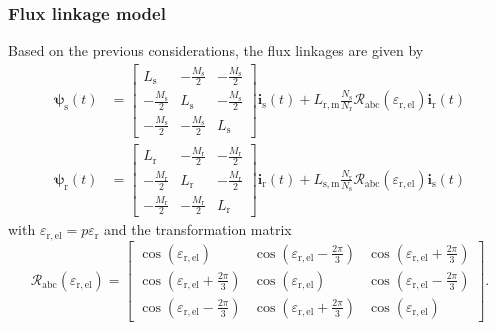 \begin{frame}
	\frametitle{Flux linkage model}
    Based on the previous considerations, the flux linkages are given by
    \begin{equation}
        \renewcommand*{\arraystretch}{1.15}
        \begin{split}
            \bm{\psi}_\mathrm{s}(t) &=\begin{bmatrix}
                L_\mathrm{s} & -\frac{M_\mathrm{s}}{2} & -\frac{M_\mathrm{s}}{2}\\
                -\frac{M_\mathrm{s}}{2} & L_\mathrm{s} & -\frac{M_\mathrm{s}}{2}\\
                -\frac{M_\mathrm{s}}{2} & -\frac{M_\mathrm{s}}{2} & L_\mathrm{s}
            \end{bmatrix} \bm{i}_\mathrm{s}(t) +  L_{\mathrm{r,m}}\frac{N_\mathrm{s}}{N_\mathrm{r}} \bm{\mathcal{R}}_\mathrm{abc}(\varepsilon_\mathrm{r,el})\bm{i}_\mathrm{r}(t)\\
            \bm{\psi}_\mathrm{r}(t) &= \begin{bmatrix}
                L_\mathrm{r} & -\frac{M_\mathrm{r}}{2} & -\frac{M_\mathrm{r}}{2}\\
                -\frac{M_\mathrm{r}}{2} & L_\mathrm{r} & -\frac{M_\mathrm{r}}{2}\\
                -\frac{M_\mathrm{r}}{2} & -\frac{M_\mathrm{r}}{2} & L_\mathrm{r}
            \end{bmatrix} \bm{i}_\mathrm{r}(t) +  L_{\mathrm{s,m}}\frac{N_\mathrm{r}}{N_\mathrm{s}} \bm{\mathcal{R}}_\mathrm{abc}(\varepsilon_\mathrm{r,el})\bm{i}_\mathrm{s}(t) 
        \end{split}
    \end{equation}
    with $\varepsilon_\mathrm{r,el}=p\varepsilon_\mathrm{r}$ and the transformation matrix
    \begin{equation}
        \renewcommand*{\arraystretch}{1.15}
        \bm{\mathcal{R}}_\mathrm{abc}(\varepsilon_\mathrm{r,el}) =\begin{bmatrix}
           \cos(\varepsilon_\mathrm{r,el})  & \cos(\varepsilon_\mathrm{r,el} - \frac{2\pi}{3}) & \cos(\varepsilon_\mathrm{r,el} + \frac{2\pi}{3})\\
            \cos(\varepsilon_\mathrm{r,el} + \frac{2\pi}{3}) & \cos(\varepsilon_\mathrm{r,el}) & \cos(\varepsilon_\mathrm{r,el} - \frac{2\pi}{3})\\
            \cos(\varepsilon_\mathrm{r,el} - \frac{2\pi}{3}) & \cos(\varepsilon_\mathrm{r,el} + \frac{2\pi}{3}) & \cos(\varepsilon_\mathrm{r,el})
        \end{bmatrix}.
    \end{equation}
\end{frame}


